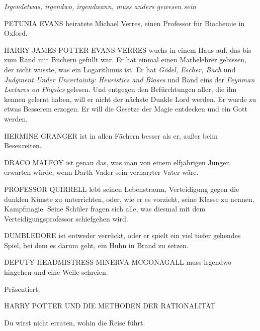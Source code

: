 \thispagestyle{empty}
{
    \small
    \parindent=0pt
    \begin{center}
        \emph{Irgendetwas, irgendwo, irgendwann, muss anders gewesen sein\el}
    \end{center}

    \MakeUppercase{Petunia Evans} heiratete Michael Verres, einen Professor
    für Biochemie in Oxford.

    \bigskip
    \MakeUppercase{Harry James Potter-Evans-Verres} wuchs in einem Haus auf,
    das bis zum Rand mit Büchern gefüllt war. Er hat einmal einen Mathelehrer
    gebissen, der nicht wusste, was ein Logarithmus ist. Er hat \emph{Gödel, Escher,
    Bach} und \emph{Judgment Under Uncertainty: Heuristics and Biases} und Band
    eins der \emph{Feynman Lectures on Physics} gelesen. Und entgegen den
    Befürchtungen aller, die ihn kennen gelernt haben, will er nicht der
    nächste Dunkle Lord werden. Er wurde zu etwas Besserem erzogen. Er will
    die Gesetze der Magie entdecken und ein Gott werden.

    \bigskip
    \MakeUppercase{Hermine Granger} ist in allen Fächern besser als er, außer
    beim Besenreiten.

    \bigskip
    \MakeUppercase{Draco Malfoy} ist genau das, was man von einem elfjährigen
    Jungen erwarten würde, wenn Darth Vader sein vernarrter Vater wäre.

    \bigskip
    \MakeUppercase{Professor Quirrell} lebt seinen Lebenstraum, Verteidigung
    gegen die dunklen Künste zu unterrichten, oder, wie er es vorzieht, seine
     Klasse zu nennen, Kampfmagie. Seine Schüler fragen sich alle, was diesmal
      mit dem Verteidigungsprofessor schiefgehen wird.

    \bigskip
    \MakeUppercase{Dumbledore} ist entweder verrückt, oder er spielt ein viel
    tiefer gehendes Spiel, bei dem es darum geht, ein Huhn in Brand zu setzen.

    \bigskip
    \MakeUppercase{Deputy Headmistress Minerva Mcgonagall} muss irgendwo
    hingehen und eine Weile schreien.

    \begin{center}
        Präsentiert:

        \bigskip
        \MakeUppercase{Harry Potter und die Methoden der Rationalität}

        \bigskip
        Du wirst nicht erraten, wohin die Reise führt.
    \end{center}
}
